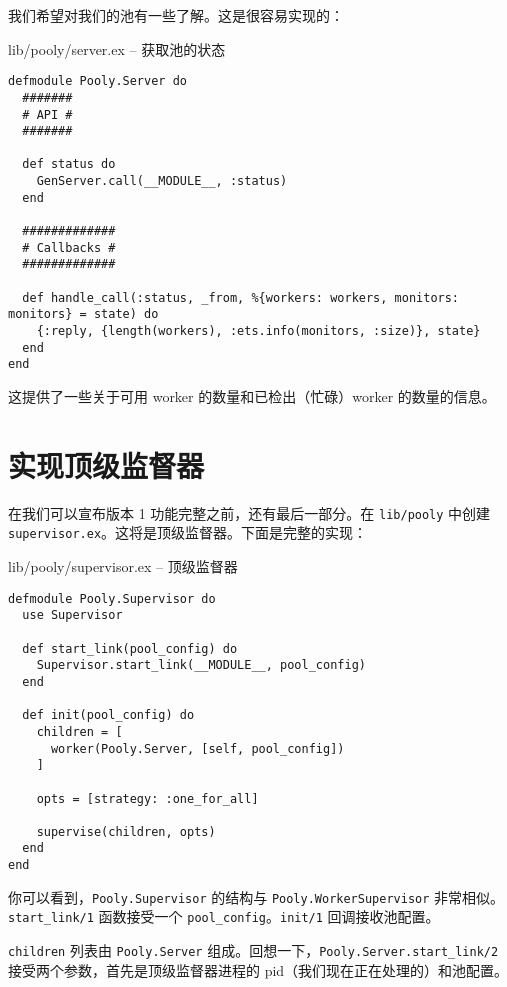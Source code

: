 我们希望对我们的池有一些了解。这是很容易实现的：

\begin{code}{lib/pooly/server.ex -- 获取池的状态}

\begin{verbatim}
defmodule Pooly.Server do
  #######
  # API #
  #######

  def status do
    GenServer.call(__MODULE__, :status)
  end

  #############
  # Callbacks #
  #############

  def handle_call(:status, _from, %{workers: workers, monitors: monitors} = state) do
    {:reply, {length(workers), :ets.info(monitors, :size)}, state}
  end
end
\end{verbatim}
\end{code}

这提供了一些关于可用 worker 的数量和已检出（忙碌）worker 的数量的信息。

\section{实现顶级监督器}

在我们可以宣布版本 1 功能完整之前，还有最后一部分。在
\texttt{lib/pooly} 中创建
\texttt{supervisor.ex}。这将是顶级监督器。下面是完整的实现：

\begin{code}{lib/pooly/supervisor.ex -- 顶级监督器}

\begin{verbatim}
defmodule Pooly.Supervisor do
  use Supervisor

  def start_link(pool_config) do
    Supervisor.start_link(__MODULE__, pool_config)
  end

  def init(pool_config) do
    children = [
      worker(Pooly.Server, [self, pool_config])
    ]

    opts = [strategy: :one_for_all]

    supervise(children, opts)
  end
end
\end{verbatim}
\end{code}

你可以看到，\texttt{Pooly.Supervisor} 的结构与
\texttt{Pooly.WorkerSupervisor}
非常相似。\texttt{start\_link/1} 函数接受一个
\texttt{pool\_config}。\texttt{init/1}
回调接收池配置。

\texttt{children} 列表由
\texttt{Pooly.Server}
组成。回想一下，\texttt{Pooly.Server.start\_link/2}
接受两个参数，首先是顶级监督器进程的 pid（我们现在正在处理的）和池配置。


